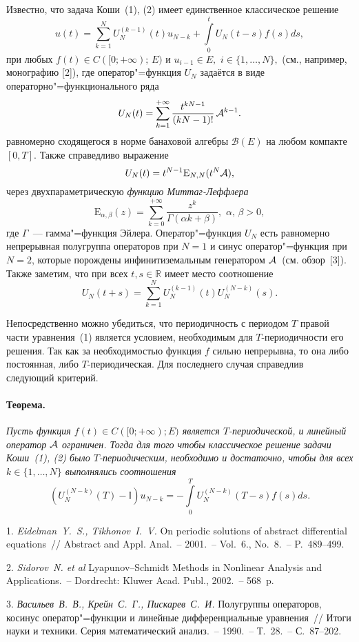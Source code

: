 Известно, что задача Коши~(1), (2) имеет единственное классическое решение
$$
u(t)=\sum\limits_{k=1}^{N}U_{N}^{(k-1)}(t)u_{N-k}+\int\limits_{0}^{t}U_{N}(t-s)f(s)ds,
$$
при любых $f(t)\in C([0;+\infty);\,E)$ и $u_{i-1}\in E,\,\,i\in\lbrace 1,\ldots,N\rbrace,$ (см., например, монографию [2]), где оператор"=функция $U_{N}$ задаётся в виде операторно"=функционального ряда
$$
U_{N}(t)=\sum\limits_{k=1}^{+\infty}\frac{t^{kN-1}}{(kN-1)!}\,{\cal A}^{k-1}.
$$
равномерно сходящегося в норме банаховой алгебры ${\mathscr B}(E)$ на любом компакте $[0,T]$. Также справедливо выражение
$$
U_{N}(t)=t^{N-1}{\mathrm E}_{N,N}(t^{N}{\cal A}),
$$
через двухпараметрическую {\it функцию Миттаг-Леффлера}
$$
{\mathrm E}_{\alpha,\beta}(z)=\sum\limits_{k=0}^{+\infty}\frac{z^{k}}{\Gamma(\alpha k+\beta)},\,\,\alpha,\,\beta>0,
$$
где $\Gamma$~--- гамма"=функция Эйлера. Оператор"=функция $U_{N}$ есть равномерно непрерывная полугруппа операторов при $N=1$ и синус оператор"=функция при $N=2$, которые порождены инфинитиземальным генератором ${\cal A}$~(см. обзор~[3]). Также заметим, что при всех $t,s\in{\mathbb R}$ имеет место  соотношение
$$
U_{N}(t+s)=\sum\limits_{k=1}^{N}U_{N}^{(k-1)}(t)U_{N}^{(N-k)}(s).
$$

Непосредственно можно убедиться, что периодичность с периодом $T$ правой части  уравнения~(1) является условием, необходимым для $T$-периодичности его решения. Так как за необходимостью функция $f$ сильно непрерывна, то она либо постоянная, либо $T$-периодическая. Для последнего случая справедлив следующий критерий.

\paragraph{Теорема.} {\it Пусть функция $f(t)\in C([0;+\infty);E)$ является $T$-периодической, и линейный оператор ${\cal A}$ ограничен. Тогда для того чтобы классическое решение задачи Коши~(1), (2) было $T$-периодическим,  необходимо и достаточно, чтобы для всех $k\in\lbrace 1,\ldots,N\rbrace$ выполнялись соотношения
$$
(U_{N}^{(N-k)}(T)-{\mathbb I})u_{N-k}=-\int\limits_{0}^{T}U_{N}^{(N-k)}(T-s)f(s)ds.
$$}


\litlist

1. {\it Eidelman~Y.~S., Tikhonov~I.~V.} On periodic solutions of abstract differential equations~// Abstract and Appl. Anal.~– 2001.~– Vol.~6., No.~8.~– P.~489–499.

2. {\it Sidorov~N. et al} Lyapunov–Schmidt Methods in Nonlinear Analysis and Applications.~– Dordrecht: Kluwer Acad. Publ., 2002.~– 568~p.


3. {\it Васильев~В.~В., Крейн~С.~Г., Пискарев~С.~И.} Полугруппы операторов, косинус оператор"=функции и линейные дифференциальные уравнения~// Итоги науки и техники. Серия математический анализ.~– 1990.~– Т.~28.~– С.~87–202.
